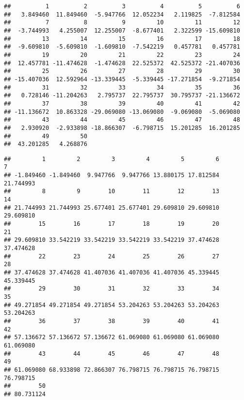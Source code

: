\documentclass[]{article}
\newenvironment{Shaded}{\begin{snugshade}}{\end{snugshade}}
\newcommand{\CommentTok}[1]{\textcolor[rgb]{0.56,0.35,0.01}{\textit{#1}}}
\newcommand{\OperatorTok}[1]{\textcolor[rgb]{0.81,0.36,0.00}{\textbf{#1}}}
\newcommand{\NormalTok}[1]{#1}
\begin{document}
\begin{verbatim}
##          1          2          3          4          5          6 
##   3.849460  11.849460  -5.947766  12.052234   2.119825  -7.812584 
##          7          8          9         10         11         12 
##  -3.744993   4.255007  12.255007  -8.677401   2.322599 -15.609810 
##         13         14         15         16         17         18 
##  -9.609810  -5.609810  -1.609810  -7.542219   0.457781   0.457781 
##         19         20         21         22         23         24 
##  12.457781 -11.474628  -1.474628  22.525372  42.525372 -21.407036 
##         25         26         27         28         29         30 
## -15.407036  12.592964 -13.339445  -5.339445 -17.271854  -9.271854 
##         31         32         33         34         35         36 
##   0.728146 -11.204263   2.795737  22.795737  30.795737 -21.136672 
##         37         38         39         40         41         42 
## -11.136672  10.863328 -29.069080 -13.069080  -9.069080  -5.069080 
##         43         44         45         46         47         48 
##   2.930920  -2.933898 -18.866307  -6.798715  15.201285  16.201285 
##         49         50 
##  43.201285   4.268876
\end{verbatim}

\begin{Shaded}
\end{Shaded}

\begin{verbatim}
##         1         2         3         4         5         6         7 
## -1.849460 -1.849460  9.947766  9.947766 13.880175 17.812584 21.744993 
##         8         9        10        11        12        13        14 
## 21.744993 21.744993 25.677401 25.677401 29.609810 29.609810 29.609810 
##        15        16        17        18        19        20        21 
## 29.609810 33.542219 33.542219 33.542219 33.542219 37.474628 37.474628 
##        22        23        24        25        26        27        28 
## 37.474628 37.474628 41.407036 41.407036 41.407036 45.339445 45.339445 
##        29        30        31        32        33        34        35 
## 49.271854 49.271854 49.271854 53.204263 53.204263 53.204263 53.204263 
##        36        37        38        39        40        41        42 
## 57.136672 57.136672 57.136672 61.069080 61.069080 61.069080 61.069080 
##        43        44        45        46        47        48        49 
## 61.069080 68.933898 72.866307 76.798715 76.798715 76.798715 76.798715 
##        50 
## 80.731124
\end{verbatim}
\end{document}
